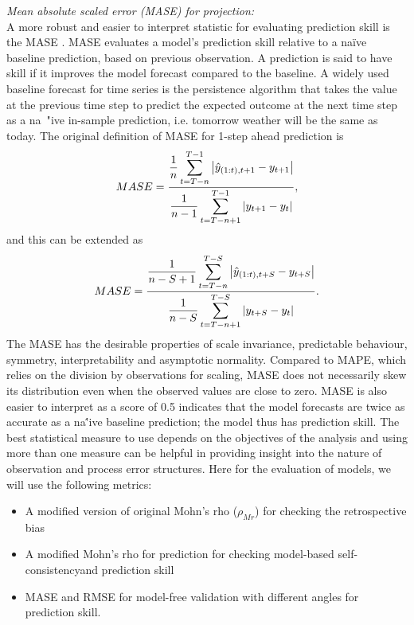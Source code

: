 \vspace{0.2cm} \noindent
{\it Mean absolute scaled error (MASE) for projection:}\\ 
A more robust and easier to interpret statistic for evaluating prediction skill is the MASE \parencite{hyndman2006another}. MASE evaluates a model's prediction skill relative to a na\" {i}ve baseline prediction, based on previous observation. A prediction is said to have skill if it improves the model forecast compared to the baseline. A widely used baseline forecast for time series is the persistence algorithm that takes the value at the previous time step to predict the expected outcome at the next time step as a na\ "{i}ve in-sample prediction, i.e. tomorrow weather will be the same as today. The original definition of MASE for 1-step ahead prediction is 
\begin{equation}
\label{eqn:mase}
{MASE=\frac{\displaystyle\frac{1}{n} \sum_{t=T-n}^{T-1} \left| \hat{y}_{(1:t),t+1}-y_{t+1} \right|}
{\displaystyle\frac{1}{n-1} \sum_{t=T-n+1}^{T-1} \left|y_{t+1}-y_{t}\right|}}, 
\end{equation}
and this can be extended as 
\begin{equation}
MASE=
\frac{\displaystyle \frac{1}{n-S+1} \sum_{t=T-n}^{T-S}  \left| \hat{y}_{(1:t),t+S}-y_{t+S} \right|}
{\displaystyle \frac{1}{n-S} \sum_{t=T-n+1}^{T-S} \left|y_{t+S}-y_{t}\right|}. 
\end{equation} 
The MASE has the desirable properties of scale invariance, predictable behaviour, symmetry, interpretability and asymptotic normality. Compared to MAPE, which relies on the division by observations for scaling, MASE does not necessarily skew its distribution even when the observed values are close to zero. MASE is also easier to interpret as a score of 0.5 indicates that the model forecasts are twice as accurate as a na\''{i}ve baseline prediction; the model thus has prediction skill.
\vspace{0.2cm} 
The best statistical measure to use depends on the objectives of the analysis and using more than one measure can be helpful in providing insight into the nature of observation and process error structures. Here for the evaluation of models, we will use the following metrics: 

\begin{itemize}
\item A modified version of original Mohn's rho ($\rho_{Mr}$) for checking the retrospective bias \\
\vspace{-0.3cm}
\item A modified Mohn's rho for prediction for checking model-based self-consistencyand prediction skill \\
\vspace{-0.3cm}
\item MASE and RMSE for model-free validation with different angles for prediction skill. 
\end{itemize}
